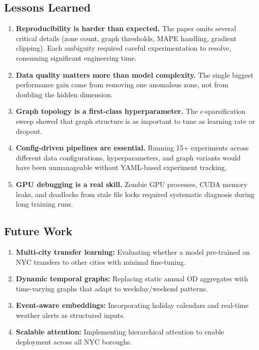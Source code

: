\documentclass{rapportECL}
\begin{document}
\subsection{Lessons Learned}
\begin{enumerate}[leftmargin=*]
    \item \textbf{Reproducibility is harder than expected.} The paper omits several critical details (zone count, graph thresholds, MAPE handling, gradient clipping). Each ambiguity required careful experimentation to resolve, consuming significant engineering time.
    \item \textbf{Data quality matters more than model complexity.} The single biggest performance gain came from removing one anomalous zone, not from doubling the hidden dimension.
    \item \textbf{Graph topology is a first-class hyperparameter.} The $\epsilon$-sparsification sweep showed that graph structure is as important to tune as learning rate or dropout.
    \item \textbf{Config-driven pipelines are essential.} Running 15+ experiments across different data configurations, hyperparameters, and graph variants would have been unmanageable without YAML-based experiment tracking.
    \item \textbf{GPU debugging is a real skill.} Zombie GPU processes, CUDA memory leaks, and deadlocks from stale file locks required systematic diagnosis during long training runs.
\end{enumerate}

\subsection{Future Work}
\begin{enumerate}[leftmargin=*]
    \item \textbf{Multi-city transfer learning:} Evaluating whether a model pre-trained on NYC transfers to other cities with minimal fine-tuning.
    \item \textbf{Dynamic temporal graphs:} Replacing static annual OD aggregates with time-varying graphs that adapt to weekday/weekend patterns.
    \item \textbf{Event-aware embeddings:} Incorporating holiday calendars and real-time weather alerts as structured inputs.
    \item \textbf{Scalable attention:} Implementing hierarchical attention to enable deployment across all NYC boroughs.
\end{enumerate}
\end{document}
